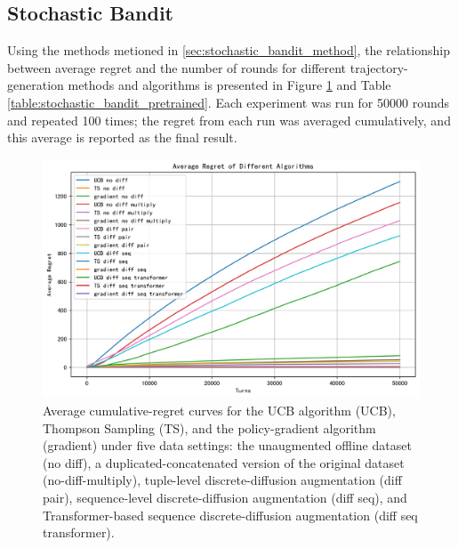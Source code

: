 \subsection{Stochastic Bandit}

Using the methods metioned in \ref{sec:stochastic_bandit_method}, the relationship between average regret and the number of rounds for different trajectory-generation methods and algorithms is presented in Figure \ref{fig:stochastic_bandit_pretrained} and Table \ref{table:stochastic_bandit_pretrained}. Each experiment was run for 50000 rounds and repeated 100 times; the regret from each run was averaged cumulatively, and this average is reported as the final result.

\begin{figure}[htbp]
    \centering
    \includegraphics[width=\textwidth]{./Img/stochastic_bandit/pretrain.png}
    \caption{Average cumulative-regret curves for the UCB algorithm (UCB), Thompson Sampling (TS), and the policy-gradient algorithm (gradient) under five data settings: the unaugmented offline dataset (no diff), a duplicated-concatenated version of the original dataset (no-diff-multiply), tuple-level discrete-diffusion augmentation (diff pair), sequence-level discrete-diffusion augmentation (diff seq), and Transformer-based sequence discrete-diffusion augmentation (diff seq transformer).}
    \label{fig:stochastic_bandit_pretrained}
\end{figure}



